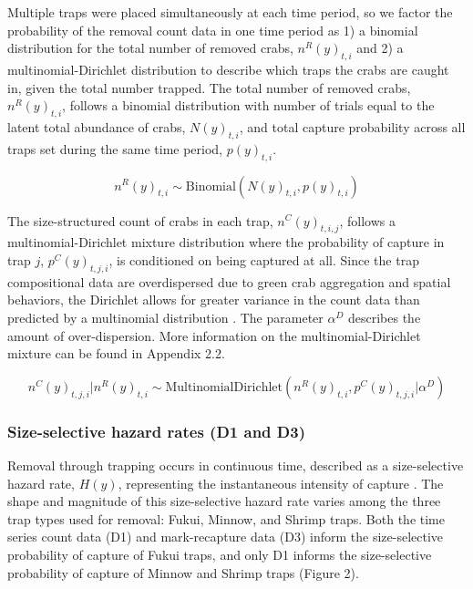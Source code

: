 \documentclass{article}
\begin{document}
Multiple traps were placed simultaneously at each time period, so we factor the probability of the removal count data in one time period as 1) a binomial distribution for the total number of removed crabs, $n^R(y)_{t,i}$ and 2) a multinomial-Dirichlet distribution to describe which traps the crabs are caught in, given the total number trapped. The total number of removed crabs, $n^R(y)_{t,i}$, follows a binomial distribution with number of trials equal to the latent total abundance of crabs, $N(y)_{t,i}$, and total capture probability across all traps set during the same time period, $p(y)_{t,i}$.

\begin{equation}
n^R(y)_{t,i} \sim \text{Binomial}(N(y)_{t,i}, p(y)_{t,i})
\end{equation}

The size-structured count of crabs in each trap, $n^C(y)_{t,i,j}$, follows a multinomial-Dirichlet mixture distribution where the probability of capture in trap $j$, $p^C(y)_{t,j,i}$, is conditioned on being captured at all. Since the trap compositional data are overdispersed due to green crab aggregation and spatial behaviors, the Dirichlet allows for greater variance in the count data than predicted by a multinomial distribution \parencite{thorson2017model}. The parameter $\alpha^D$ describes the amount of over-dispersion.  More information on the multinomial-Dirichlet mixture can be found in Appendix 2.2.

\begin{equation}
n^C(y)_{t,j,i} | n^R(y)_{t,i} \sim \text{MultinomialDirichlet}(n^R(y)_{t,i}, p^C(y)_{t,j,i}| \alpha^D)
\end{equation}

\subsubsection*{Size-selective hazard rates (D1 and D3)}

Removal through trapping occurs in continuous time, described as a size-selective hazard rate, $H(y)$, representing the instantaneous intensity of capture \parencite{ergon2018utility}. The shape and magnitude of this size-selective hazard rate varies among the three trap types used for removal: Fukui, Minnow, and Shrimp traps. Both the time series count data (D1) and mark-recapture data (D3) inform the size-selective probability of capture of Fukui traps, and only D1 informs the size-selective probability of capture of Minnow and Shrimp traps (Figure 2). 
\end{document}
